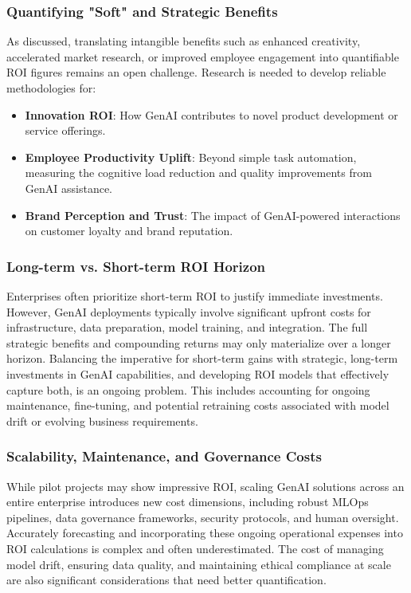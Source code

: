 \documentclass[10pt,journal,compsoc,twocolumn]{IEEEtran}
\begin{document}
\subsubsection{Quantifying "Soft" and Strategic Benefits}

As discussed, translating intangible benefits such as enhanced creativity, accelerated market research, or improved employee engagement into quantifiable ROI figures remains an open challenge. Research is needed to develop reliable methodologies for:
\begin{itemize}
  \item \textbf{Innovation ROI}: How GenAI contributes to novel product development or service offerings.
  \item \textbf{Employee Productivity Uplift}: Beyond simple task automation, measuring the cognitive load reduction and quality improvements from GenAI assistance.
  \item \textbf{Brand Perception and Trust}: The impact of GenAI-powered interactions on customer loyalty and brand reputation.
\end{itemize}


\subsubsection{Long-term vs. Short-term ROI Horizon}

Enterprises often prioritize short-term ROI to justify immediate investments. However, GenAI deployments typically involve significant upfront costs for infrastructure, data preparation, model training, and integration. The full strategic benefits and compounding returns may only materialize over a longer horizon. Balancing the imperative for short-term gains with strategic, long-term investments in GenAI capabilities, and developing ROI models that effectively capture both, is an ongoing problem. This includes accounting for ongoing maintenance, fine-tuning, and potential retraining costs associated with model drift or evolving business requirements.


\subsubsection{Scalability, Maintenance, and Governance Costs}

While pilot projects may show impressive ROI, scaling GenAI solutions across an entire enterprise introduces new cost dimensions, including robust MLOps pipelines, data governance frameworks, security protocols, and human oversight. Accurately forecasting and incorporating these ongoing operational expenses into ROI calculations is complex and often underestimated. The cost of managing model drift, ensuring data quality, and maintaining ethical compliance at scale are also significant considerations that need better quantification.
\end{document}
